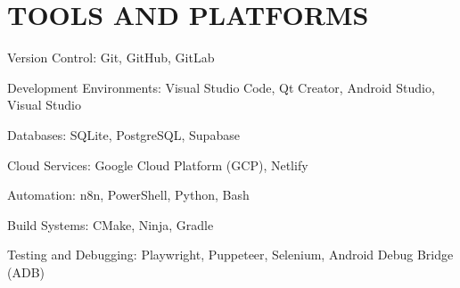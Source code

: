 \documentclass[11pt,letterpaper]{article}
\begin{document}
\section*{TOOLS AND PLATFORMS}

Version Control: Git, GitHub, GitLab

Development Environments: Visual Studio Code, Qt Creator, Android Studio, Visual Studio

Databases: SQLite, PostgreSQL, Supabase

Cloud Services: Google Cloud Platform (GCP), Netlify

Automation: n8n, PowerShell, Python, Bash

Build Systems: CMake, Ninja, Gradle

Testing and Debugging: Playwright, Puppeteer, Selenium, Android Debug Bridge (ADB)

\end{document}
